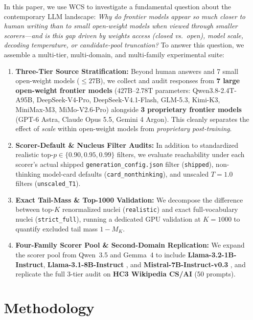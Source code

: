 \documentclass[11pt,a4paper,twocolumn]{article}
\begin{document}
In this paper, we use WCS to investigate a fundamental question about the contemporary LLM landscape: \emph{Why do frontier models appear so much closer to human writing than to small open-weight models when viewed through smaller scorers---and is this gap driven by weights access (closed vs.\ open), model scale, decoding temperature, or candidate-pool truncation?} To answer this question, we assemble a multi-tier, multi-domain, and multi-family experimental suite:
\begin{enumerate}
    \item \textbf{Three-Tier Source Stratification:} Beyond human answers and 7 small open-weight models ($\le 27\text{B}$), we collect and audit responses from \textbf{7 large open-weight frontier models} ($427\text{B}$--$2.78\text{T}$ parameters: Qwen3.8-2.4T-A95B, DeepSeek-V4-Pro, DeepSeek-V4.1-Flash, GLM-5.3, Kimi-K3, MiniMax-M3, MiMo-V2.6-Pro) alongside \textbf{3 proprietary frontier models} (GPT-6 Astra, Claude Opus 5.5, Gemini 4 Argon). This cleanly separates the effect of \emph{scale} within open-weight models from \emph{proprietary post-training}.
    \item \textbf{Scorer-Default \& Nucleus Filter Audits:} In addition to standardized realistic top-$p \in \{0.90, 0.95, 0.99\}$ filters, we evaluate reachability under each scorer's actual shipped \texttt{generation\_config.json} filter (\texttt{shipped}), non-thinking model-card defaults (\texttt{card\_nonthinking}), and unscaled $T=1.0$ filters (\texttt{unscaled\_T1}).
    \item \textbf{Exact Tail-Mass \& Top-1000 Validation:} We decompose the difference between top-$K$ renormalized nuclei (\texttt{realistic}) and exact full-vocabulary nuclei (\texttt{strict\_full}), running a dedicated GPU validation at $K=1000$ to quantify excluded tail mass $1 - M_K$.
    \item \textbf{Four-Family Scorer Pool \& Second-Domain Replication:} We expand the scorer pool from Qwen~3.5 and Gemma~4 to include \textbf{Llama-3.2-1B-Instruct}, \textbf{Llama-3.1-8B-Instruct} \cite{grattafiori2024llama3}, and \textbf{Mistral-7B-Instruct-v0.3} \cite{jiang2023mistral}, and replicate the full 3-tier audit on \textbf{HC3 Wikipedia CS/AI} (50 prompts).
\end{enumerate}

\section{Methodology}
\end{document}
